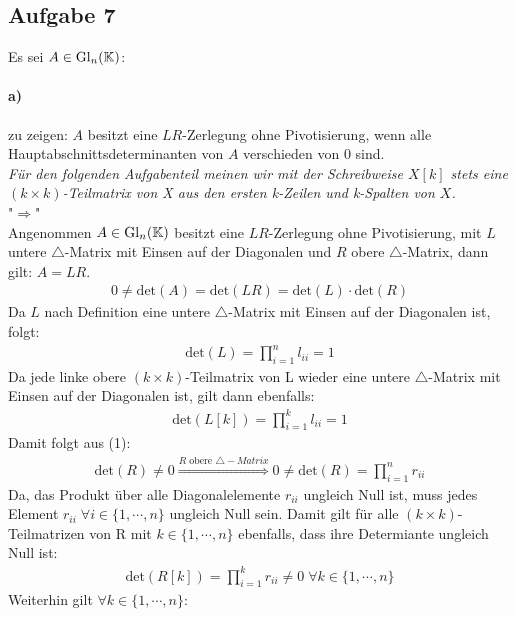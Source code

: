 \subsection*{Aufgabe 7}
Es sei $A \in \mathrm{Gl}_n (\mathbb K)$: 
\paragraph*{a)}
zu zeigen: $A$ besitzt eine $LR$-Zerlegung ohne Pivotisierung, wenn alle Hauptabschnittsdeterminanten von $A$ verschieden von 0 sind.\\
\newline
\textit{F\"ur den folgenden Aufgabenteil meinen wir mit der Schreibweise $X[k]$ stets eine $(k \times k)$-Teilmatrix von X aus den ersten k-Zeilen und k-Spalten von $X$.\\}
\newline
"$\Rightarrow$"\\
Angenommen $A \in \mathrm{Gl}_n (\mathbb K)$ besitzt eine $LR$-Zerlegung ohne Pivotisierung, mit $L$ untere $\triangle$-Matrix mit Einsen auf der Diagonalen und $R$ obere $\triangle$-Matrix, dann gilt:
\textit{} $A=LR$.
\begin{align}
0 \neq \mathrm{det}(A) = \mathrm{det}(LR) = \mathrm{det}(L)\cdot \mathrm{det}(R)
\end{align}
Da $L$ nach Definition eine untere $\triangle$-Matrix mit Einsen auf der Diagonalen ist, folgt:
\begin{align}
\mathrm{det}(L)=\prod_{i=1}^{n} l_{ii}=1
\end{align} 
Da jede linke obere $(k \times k)$-Teilmatrix von L wieder eine untere $\triangle$-Matrix mit Einsen auf der Diagonalen ist, gilt dann ebenfalls:
\begin{align}
\mathrm{det}(L[k])=\prod_{i=1}^{k} l_{ii}=1
\end{align}
Damit folgt aus (1):
\begin{align}
\mathrm{det}(R) \neq 0 \overset{R\text{ obere }\triangle-Matrix}{\Rightarrow} 0 \neq \mathrm{det}(R)=\prod_{i=1}^{n} r_{ii}
\end{align}
Da, das Produkt \"uber alle Diagonalelemente $r_{ii}$ ungleich Null ist, muss jedes Element  $r_{ii} \; \forall i \in\{1,\cdots,n\}$ ungleich Null sein. Damit gilt f\"ur alle $(k \times k)$-Teilmatrizen von R mit  $k \in\{1,\cdots,n\}$ ebenfalls, dass ihre Determiante ungleich Null ist:
\begin{align}
\mathrm{det}(R[k])= \prod_{i=1}^{k} r_{ii} \neq 0 \; \forall k \in\{1,\cdots,n\}
\end{align} 
Weiterhin gilt $\forall k \in\{1,\cdots,n\}$:
